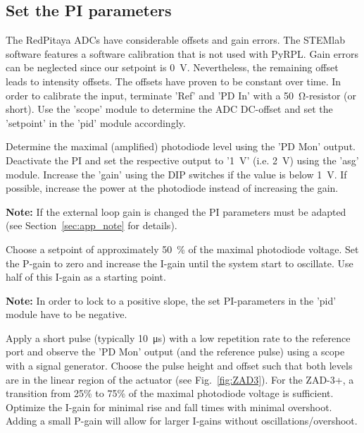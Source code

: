 \documentclass[twoside,a4paper]{refart}
\begin{document}
\subsection{Set the PI parameters}

The RedPitaya ADCs have considerable offsets and gain errors. The STEMlab software features a software calibration that is not used with PyRPL. Gain errors can be neglected since our setpoint is \SI{0}{\volt}. Nevertheless, the remaining offset leads to intensity offsets. The offsets have proven to be constant over time. In order to calibrate the input, terminate 'Ref' and 'PD In' with a \SI{50}{\ohm}-resistor (or short). Use the 'scope' module to determine the ADC DC-offset and set the 'setpoint' in the 'pid' module accordingly.


Determine the maximal (amplified) photodiode level using the 'PD Mon' output. Deactivate the PI and set the respective output to '\SI{1}{\volt}' (i.e. \SI{2}{\volt}) using the 'asg' module. Increase the 'gain' using the DIP switches if the value is below \SI{1}{\volt}. If possible, increase the power at the photodiode instead of increasing the gain. 

\textbf{Note:}
If the external loop gain is changed the PI parameters must be adapted (see Section~\ref{sec:app_note} for details).

Choose a setpoint of approximately \SI{50}{\percent} of the maximal photodiode voltage. Set the P-gain to zero and increase the I-gain until the system start to oscillate. Use half of this I-gain as a starting point.

\textbf{Note:}
In order to lock to a positive slope, the set PI-parameters in the 'pid' module have to be negative.

Apply a short pulse (typically \SI{10}{\micro\second}) with a low repetition rate to the reference port and observe the 'PD Mon' output (and the reference pulse) using a scope with a signal generator. Choose the pulse height and offset such that both levels are in the linear region of the actuator (see Fig.~\ref{fig:ZAD3}). For the ZAD-3+, a transition from 25\% to 75\% of the maximal photodiode voltage is sufficient. Optimize the I-gain for minimal rise and fall times with minimal overshoot. Adding a small P-gain will allow for larger I-gains without oscillations/overshoot.
\end{document}
